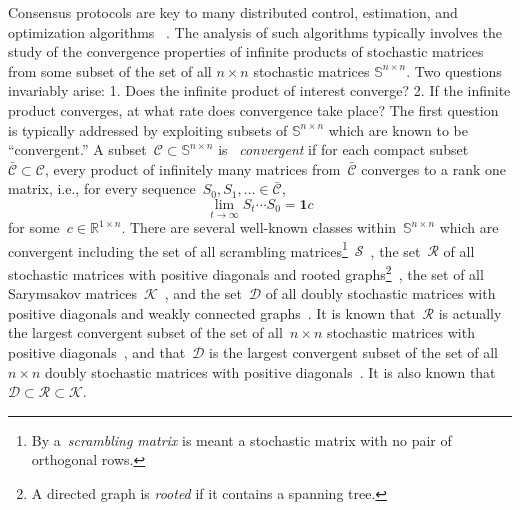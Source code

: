 \documentclass[letterpaper, 10 pt, conference]{ieeeconf}  %
\newcommand{\R}{\mathbb R}
\newcommand{\stoc}{\mathbb{S}} %
\newcommand{\stocpd}{\mathcal{R}} %
\newcommand{\stocsary}{\mathcal{K}} %
\newcommand{\stocscr}{\mathcal{S}} %
\newcommand{\dblstocpd}{\mathcal{D}} %
\begin{document}
Consensus protocols are key to many distributed control, estimation, and optimization algorithms ~\cite{Bullo2009DistRobots,Jadbabaie2003Coordination,Nedic2009DistributedSubgradient,OlfatiSaber2007ConsensusAndCooperation,Tsitsiklis1984Thesis}. 
The analysis of such algorithms typically involves the study of the convergence properties of infinite products of stochastic matrices from some subset of the set of all $n \times n$ stochastic matrices $\stoc^{n \times n}$. Two questions invariably arise: 1. Does the infinite product of interest converge? 2. If the infinite product converges, at what rate does convergence take place? The first question is typically addressed by exploiting subsets of $\stoc^{n \times n}$ which are known to be ``convergent.'' A subset~$\mathcal{C} \subset \stoc^{n \times n}$ is ~\emph{convergent} if for each compact subset~$\mathcal{\bar C} \subset \mathcal{C}$, every product of infinitely many matrices from~$\mathcal{\bar C}$ converges to a rank one matrix, i.e., for every sequence~$S_0,S_1,\ldots \in \mathcal{\bar C}$,
\begin{equation*}
    \lim_{t \to \infty} S_t \cdots S_0 = \mathbf{1} c
\end{equation*}
for some~$c \in \R^{1 \times n}$. There are several well-known classes within~$\stoc^{n \times n}$ which are convergent including the set of all scrambling matrices\footnote{By a~\emph{scrambling matrix} is meant a stochastic matrix with no pair of orthogonal rows.}~$\stocscr$~\cite{Hajnal1958}, the set~$\stocpd$ of all stochastic matrices with positive diagonals and rooted graphs\footnote{A directed graph is \emph{rooted} if it contains a spanning tree.}~\cite{Cao2008ConsensusGraphical}, the set of all Sarymsakov matrices~$\stocsary$~\cite{Xia2019GenSary}, and the set~$\dblstocpd$ of all doubly stochastic matrices with positive diagonals and weakly connected graphs~\cite{Liu2011DetGossip}. It is known that~$\stocpd$ is actually the largest convergent subset of the set of all~$n \times n$ stochastic matrices with positive diagonals~\cite{Cao2008ConsensusGraphical}, and that~$\dblstocpd$ is the largest convergent subset of the set of all~$n \times n$ doubly stochastic matrices with positive diagonals~\cite{Liu2011DetGossip}. It is also known that~$\dblstocpd \subset \stocpd \subset \stocsary$.
\end{document}
